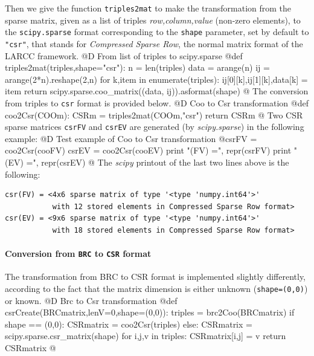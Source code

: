 \documentclass[11pt,oneside]{article}	%
\begin{document}
Then we give the function \texttt{triples2mat} to make the transformation from the sparse matrix, given as a list of triples \emph{row,column,value} (non-zero elements), to the \texttt{scipy.sparse} format corresponding to the \texttt{shape} parameter, set by default to \texttt{"csr"}, that stands for \emph{Compressed Sparse Row}, the normal matrix format of the LARCC framework. 
@D From list of triples to scipy.sparse
@{def triples2mat(triples,shape="csr"):
	n = len(triples)
	data = arange(n)
	ij = arange(2*n).reshape(2,n)
	for k,item in enumerate(triples):
		ij[0][k],ij[1][k],data[k] = item
	return scipy.sparse.coo_matrix((data, ij)).asformat(shape)
@}
The conversion from triples to \texttt{csr} format is provided below.
@D Coo to Csr transformation
@{def coo2Csr(COOm):
	CSRm = triples2mat(COOm,"csr")
	return CSRm
@}
Two CSR sparse matrices \texttt{csrFV} and \texttt{csrEV} are generated (by \emph{scipy.sparse})  in the following example:
@D Test example of Coo to Csr transformation
@{csrFV = coo2Csr(cooFV)
csrEV = coo2Csr(cooEV)
print "\ncsr(FV) =\n", repr(csrFV)
print "\ncsr(EV) =\n", repr(csrEV)
@}
The \emph{scipy} printout of the last two lines above is the following:
{\small
\begin{verbatim}
csr(FV) = <4x6 sparse matrix of type '<type 'numpy.int64'>'
		   with 12 stored elements in Compressed Sparse Row format>
csr(EV) = <9x6 sparse matrix of type '<type 'numpy.int64'>'
		   with 18 stored elements in Compressed Sparse Row format>
\end{verbatim}}

\paragraph{Conversion from \texttt{BRC} to \texttt{CSR} format}
The transformation from BRC to CSR format is implemented slightly differently, according to the fact that the matrix dimension is either unknown (\texttt{shape=(0,0)}) or known.
@D Brc to Csr transformation
@{def csrCreate(BRCmatrix,lenV=0,shape=(0,0)):
	triples = brc2Coo(BRCmatrix)
	if shape == (0,0):
		CSRmatrix = coo2Csr(triples)
	else:
		CSRmatrix = scipy.sparse.csr_matrix(shape)
		for i,j,v in triples: CSRmatrix[i,j] = v
	return CSRmatrix
@}
\end{document}
